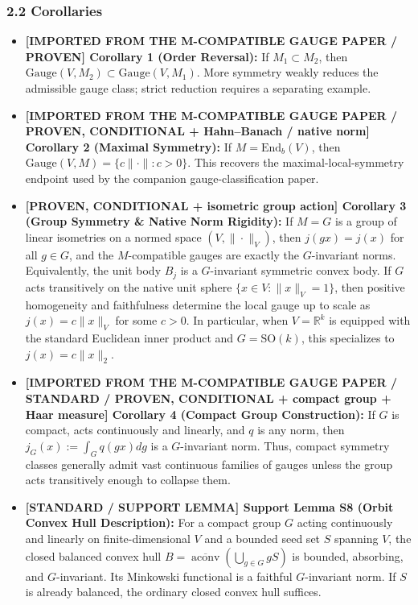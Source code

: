 \documentclass[
  11pt,
]{article}
\providecommand{\tightlist}{%
  \setlength{\itemsep}{0pt}\setlength{\parskip}{0pt}}
\providecommand{\tightlist}{%
  \setlength{\itemsep}{0pt}\setlength{\parskip}{0pt}}
\begin{document}
\subsubsection{2.2 Corollaries}\label{corollaries}

\begin{itemize}
\tightlist
\item
  \textbf{{[}IMPORTED FROM THE M-COMPATIBLE GAUGE PAPER / PROVEN{]}
  Corollary 1 (Order Reversal):} If \(M_1 \subset M_2\), then
  \(\text{Gauge}(V, M_2) \subset \text{Gauge}(V, M_1)\). More symmetry
  weakly reduces the admissible gauge class; strict reduction requires a
  separating example.
\item
  \textbf{{[}IMPORTED FROM THE M-COMPATIBLE GAUGE PAPER / PROVEN,
  CONDITIONAL + Hahn--Banach / native norm{]} Corollary 2 (Maximal
  Symmetry):} If \(M = \text{End}_b(V)\), then
  \(\text{Gauge}(V, M) = \{ c\|\cdot\| : c > 0 \}\). This recovers the
  maximal-local-symmetry endpoint used by the companion
  gauge-classification paper.
\item
  \textbf{{[}PROVEN, CONDITIONAL + isometric group action{]} Corollary 3
  (Group Symmetry \& Native Norm Rigidity):} If \(M=G\) is a group of
  linear isometries on a normed space \((V, \|\cdot\|_V)\), then
  \(j(gx) = j(x)\) for all \(g \in G\), and the \(M\)-compatible gauges
  are exactly the \(G\)-invariant norms. Equivalently, the unit body
  \(B_j\) is a \(G\)-invariant symmetric convex body. If \(G\) acts
  transitively on the native unit sphere \(\{x \in V : \|x\|_V = 1\}\),
  then positive homogeneity and faithfulness determine the local gauge
  up to scale as \(j(x)=c\|x\|_V\) for some \(c > 0\). In particular,
  when \(V = \mathbb{R}^k\) is equipped with the standard Euclidean
  inner product and \(G = \mathrm{SO}(k)\), this specializes to
  \(j(x) = c \|x\|_2\).
\item
  \textbf{{[}IMPORTED FROM THE M-COMPATIBLE GAUGE PAPER / STANDARD /
  PROVEN, CONDITIONAL + compact group + Haar measure{]} Corollary 4
  (Compact Group Construction):} If \(G\) is compact, acts continuously
  and linearly, and \(q\) is any norm, then
  \(j_G(x) := \int_G q(gx) dg\) is a \(G\)-invariant norm. Thus, compact
  symmetry classes generally admit vast continuous families of gauges
  unless the group acts transitively enough to collapse them.
\item
  \textbf{{[}STANDARD / SUPPORT LEMMA{]} Support Lemma S8 (Orbit Convex
  Hull Description):} For a compact group \(G\) acting continuously and
  linearly on finite-dimensional \(V\) and a bounded seed set \(S\)
  spanning \(V\), the closed balanced convex hull
  \(B=\overline{\operatorname{aconv}}(\bigcup_{g\in G}gS)\) is bounded,
  absorbing, and \(G\)-invariant. Its Minkowski functional is a faithful
  \(G\)-invariant norm. If \(S\) is already balanced, the ordinary
  closed convex hull suffices.
\end{itemize}
\end{document}
